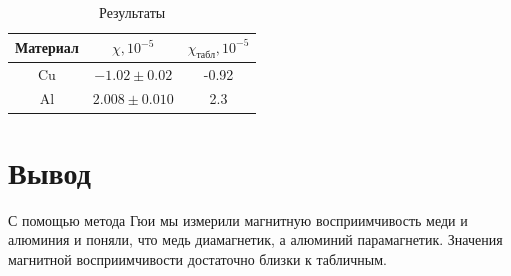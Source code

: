 \documentclass[a4paper, 12pt]{article}
\begin{document}
            \begin{table}[!ht]
                \centering
                \begin{tabular}{|c|c|c|}
                    \hline

                    Материал & $\chi, 10^{-5}$ & $\chi_{табл}, 10^{-5}$\\ \hline
                    Cu & $-1.02 \pm 0.02$ & -0.92\\ \hline
                    Al & $2.008 \pm 0.010$ & 2.3\\ \hline

                \end{tabular}
                \caption{Результаты}
                \label{tab:res}
            \end{table}

    \section{Вывод}
        С помощью метода Гюи мы измерили магнитную восприимчивость меди и алюминия и поняли, что медь диамагнетик, а алюминий парамагнетик. Значения магнитной восприимчивости достаточно близки к табличным.
\end{document}
